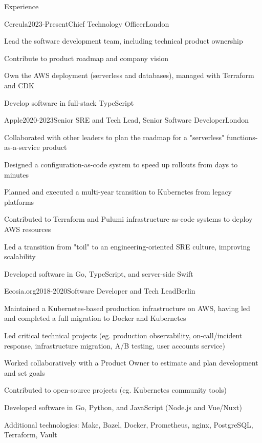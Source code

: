 \documentclass{resume} %
\begin{document}
\vspace{5 mm}

\begin{rSection}{Experience}

\begin{rSubsection}{{Cercula}}{2023-Present}{Chief Technology Officer}{London}
    \item Lead the software development team, including technical product ownership
    \item Contribute to product roadmap and company vision
    \item Own the AWS deployment (serverless and databases), managed with Terraform and CDK
    \item Develop software in full-stack TypeScript
\end{rSubsection}

\begin{rSubsection}{{Apple}}{2020-2023}{Senior SRE and Tech Lead, Senior Software Developer}{London}
    \item Collaborated with other leaders to plan the roadmap for a "serverless" functions-as-a-service product
    \item Designed a configuration-as-code system to speed up rollouts from days to minutes
    \item Planned and executed a multi-year transition to Kubernetes from legacy platforms
    \item Contributed to Terraform and Pulumi infrastructure-as-code systems to deploy AWS resources
    \item Led a transition from "toil" to an engineering-oriented SRE culture, improving scalability
    \item Developed software in Go, TypeScript, and server-side Swift
\end{rSubsection}

\begin{rSubsection}{{Ecosia.org}}{2018-2020}{Software Developer and Tech Lead}{Berlin}
    \item Maintained a Kubernetes-based production infrastructure on AWS, having led and completed a full migration to Docker and Kubernetes
    \item Led critical technical projects (eg. production observability, on-call/incident response, infrastructure migration, A/B testing, user accounts service)
    \item Worked collaboratively with a Product Owner to estimate and plan development and set goals
    \item Contributed to open-source projects (eg. Kubernetes community tools)
    \item Developed software in Go, Python, and JavaScript (Node.js and Vue/Nuxt)
    \item Additional technologies: Make, Bazel, Docker, Prometheus, nginx, PostgreSQL, Terraform, Vault
\end{rSubsection}


\end{rSection}
\end{document}
